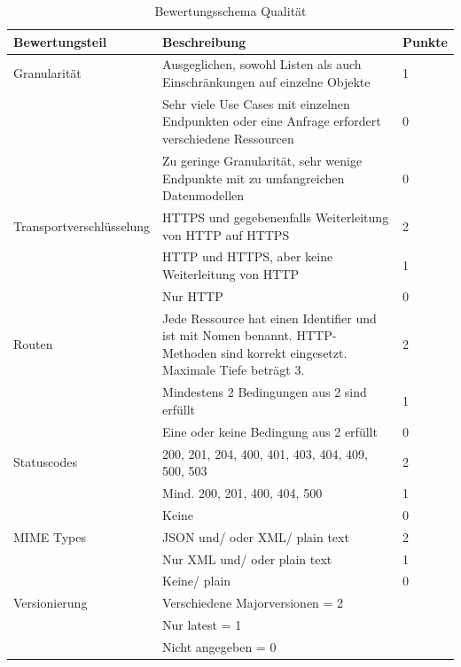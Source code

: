 \documentclass[notitlepage, hidelinks]{article}
\begin{document}
\begin{table}[H]
\begin{center}
\begin{tabular}{|p{3.6cm}|p{8.5cm}|p{2.5cm}|}
\hline
\textbf{Bewertungsteil} & \textbf{Beschreibung} & \textbf{Punkte}\\ \hline
Granularität & Ausgeglichen, sowohl Listen als auch Einschränkungen auf einzelne Objekte & 1 \\ \hline
& Sehr viele Use Cases mit einzelnen Endpunkten oder eine Anfrage erfordert verschiedene Ressourcen & 0 \\ \hline
& Zu geringe Granularität, sehr wenige Endpunkte mit zu umfangreichen Datenmodellen & 0 \\ \hline
Transportverschlüsselung & HTTPS und gegebenenfalls Weiterleitung von HTTP auf HTTPS & 2 \\ \hline
& HTTP und HTTPS, aber keine Weiterleitung von HTTP & 1 \\ \hline
& Nur HTTP & 0 \\ \hline
Routen & Jede Ressource hat einen Identifier und ist mit Nomen benannt. HTTP-Methoden sind korrekt eingesetzt. Maximale Tiefe beträgt 3. & 2 \\ \hline
& Mindestens 2 Bedingungen aus 2 sind erfüllt & 1 \\ \hline
& Eine oder keine Bedingung aus 2 erfüllt & 0 \\ \hline
Statuscodes & 200, 201, 204, 400, 401, 403, 404, 409, 500, 503 & 2\\ \hline
& Mind. 200, 201, 400, 404, 500 & 1\\ \hline
& Keine & 0\\ \hline
MIME Types & JSON und/ oder XML/ plain text & 2\\ \hline
& Nur XML und/ oder plain text & 1\\ \hline
& Keine/ plain & 0\\ \hline
Versionierung & Verschiedene Majorversionen = 2 & \\ \hline
& Nur latest = 1 & \\ \hline
& Nicht angegeben = 0 & \\ \hline
\end{tabular}
\caption{Bewertungsschema Qualität}
\label{quality}
\end{center}
\end{table}
\end{document}
